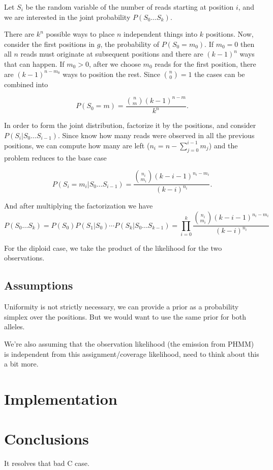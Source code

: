 Let $S_{i}$ be the random variable of the number of reads starting at position $i$,
and we are interested in the joint probability $P(S_{0} \ldots S_{k})$. %

There are $k^{n}$ possible ways to place $n$ independent things into $k$ positions.
Now, consider the first positions in $g$, the probability of $P(S_{0} = m_{0})$.
If $m_{0}=0$ then all $n$ reads must originate at subsequent positions and there
are $(k-1)^{n}$ ways that can happen.
If $m_{0} > 0$, after we choose $m_{0}$ reads for the first position,
there are $(k-1)^{n-m_{0}}$ ways to position the rest.
Since ${n \choose 0} = 1$ the cases can be combined into

\begin{equation}
  P(S_{0} = m) = \frac{{n \choose m} (k-1)^{n-m}}{k^{n}}.
\end{equation}

In order to form the joint distribution,
factorize it by the positions,
and consider $P(S_{i}| S_{0}\ldots S_{i-1})$.
Since know how many reads were observed in all the previous positions,
we can compute how many are left ($n_{i} = n - \sum_{j=0}^{i-1} m_{j}$)
and the problem reduces to the base case

\begin{equation}
  P(S_{i} = m_i | S_{0}\ldots S_{i-1}) = \frac{{n_i \choose m_i} (k-i-1)^{n_i-m_i}}{(k-i)^{n_i}}.
\end{equation}

And after multiplying the factorization we have
\begin{equation}
  P(S_{0} \ldots S_{k}) = P(S_{0}) P(S_{1} | S_{0}) \cdots P(S_{k}|S_{0}\ldots S_{k-1}) = \prod_{i=0}^{k} \frac{{n_{i}\choose m_{i}} (k-i-1)^{n_{i}-m_{i}}}{(k-i)^{n_i}}
\end{equation}

For the diploid case, we take the product of the likelihood for the two
observations.

\subsection{Assumptions}

Uniformity is not strictly necessary, we can provide a prior as a probability
simplex over the positions.
But we would want to use the same prior for both alleles.

We're also assuming that the observation likelihood (the emission from PHMM) is
independent from this assignment/coverage likelihood, need to think about this
a bit more.


\section{Implementation}

\section{Conclusions}

It resolves that bad C case.

\clearpage




\clearpage

\appendix


